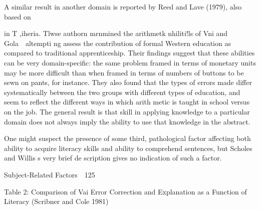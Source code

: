 \setcounter{listWWNumxxxvleveli}{29}
\begin{listWWNumxxxvleveli}
\item 
\begin{styleStandard}
A similar result in another domain is reported by Reed and Lave (1979), also based on
\end{styleStandard}


\end{listWWNumxxxvleveli}
\begin{styleStandard}
in T ,iheria. Tlwse authorn mrnmined the arithmetk nhiliti!ls of Vni and Gola\ \ altempti ng assess the contribution of formal Western education as compared to traditional apprenticeship. Their findings suggest that these abilities can be very domain-specific: the same problem framed in terms of monetary units may be more difficult than when framed in terms of numbers of buttons to be sewn on pants, for instance. They also found that the types of errors made differ systematically between the two groups with different types of education, and seem to reflect the different ways in which arith\- metic is taught in school versus on the job. The general result is that skill in applying knowledge to a particular domain does not always imply the ability to use that knowledge in the abstract.
\end{styleStandard}


\begin{listWWNumxxxvleveli}
\item 
\begin{styleStandard}
One might suspect the presence of some third, pathological factor affecting both ability to acquire literacy skills and ability to comprehend sentences, but Scholes and Willis {\textquotesingle}s very brief de\- scription gives no indication of such a factor.
\end{styleStandard}


\end{listWWNumxxxvleveli}
\clearpage\setcounter{page}{1}\begin{styleStandard}
Subject-Related Factors\ \ 125
\end{styleStandard}


\begin{styleStandard}
Table 2: Comparison of Vai Error Correction and Explanation as a Function of Literacy (Scribner and Cole 1981)
\end{styleStandard}


